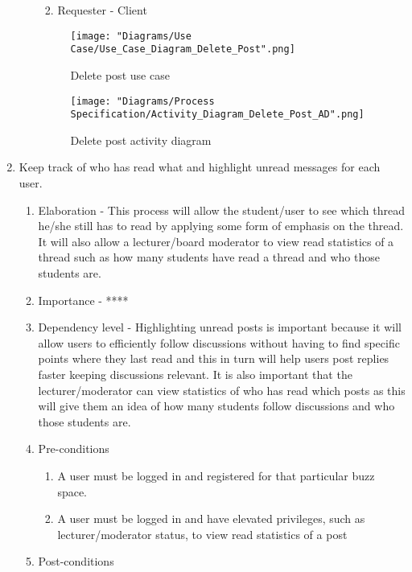 \documentclass[12pt]{article}
\begin{document}
\begin{enumerate}
\begin{enumerate}
\begin{enumerate}
\begin{enumerate}
   	 		\end{enumerate}
   	 		\item Requester - Client
  		\end{enumerate}
  	\begin{figure}[h]
  		\centering
  		\texttt{[image: "Diagrams/Use Case/Use\_Case\_Diagram\_Delete\_Post".png]}
  		\caption{Delete post use case}
  	\end{figure}
  	\begin{figure}[h]
  		\centering
  		\texttt{[image: "Diagrams/Process Specification/Activity\_Diagram\_Delete\_Post\_AD".png]}
  		\caption{Delete post activity diagram}
  	\end{figure}
  	\clearpage
  	\end{enumerate}
\clearpage %
  \item Keep track of who has read what and highlight unread messages for each user. %
  \begin{enumerate}
    \item Elaboration - This process will allow the student/user to see which thread he/she still has to read by applying some form of emphasis on the thread. It will also allow a lecturer/board moderator to view read statistics of a thread such as how many students have read a thread and who those students are.
    \item Importance - ****
    \item Dependency level - Highlighting unread posts is important because it will allow users to efficiently follow discussions without having to find specific points where they last read and this in turn will help users post replies faster keeping discussions relevant. It is also important that the lecturer/moderator can view statistics of who has read which posts as this will give them an idea of how many students follow discussions and who those students are.
    \item Pre-conditions
    \begin{enumerate}
    	\item A user must be logged in and registered for that particular buzz space.
    	\item A user must be logged in and have elevated privileges, such as lecturer/moderator status, to view read statistics of a post
    \end{enumerate}
        \item Post-conditions

\end{enumerate}
\end{enumerate}
\end{document}
